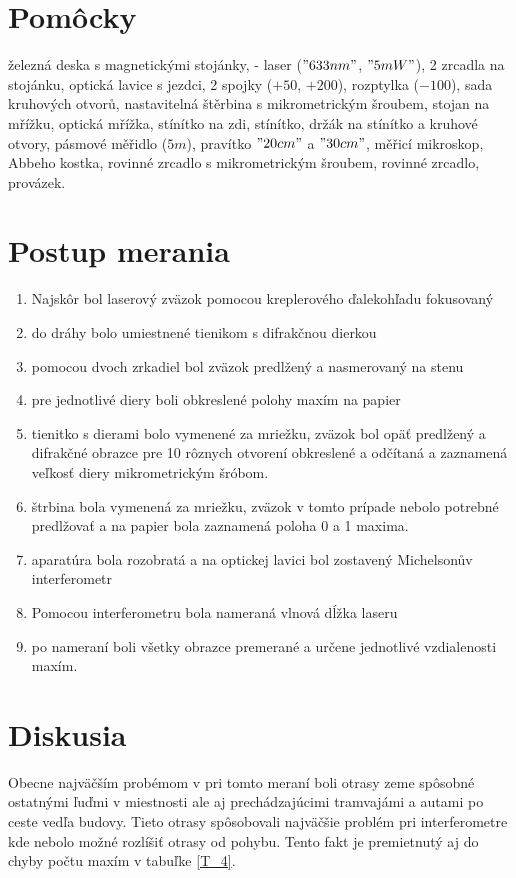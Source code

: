 \documentclass[10pt]{scrartcl}
\begin{document}
\MakeFJFIHead{}






\section{Pomôcky}
železná deska s magnetickými stojánky, - laser ($"633 nm"$, $"5 mW"$), 2 zrcadla na
stojánku, optická lavice s jezdci, 2 spojky ($+50$, $+200$), rozptylka ($−100$), sada kruhových otvorů,
nastavitelná štěrbina s mikrometrickým šroubem, stojan na mřížku, optická mřížka, stínítko na
zdi, stínítko, držák na stínítko a kruhové otvory, pásmové měřidlo ($5 m$), pravítko $"20 cm"$ a $"30 cm"$,
měřicí mikroskop, Abbeho kostka, rovinné zrcadlo s mikrometrickým šroubem, rovinné zrcadlo,
provázek.

\section{Postup merania}
\begin{enumerate}
\item Najskôr bol laserový zväzok pomocou kreplerového ďalekohľadu fokusovaný
\item do dráhy bolo umiestnené tienikom s difrakčnou dierkou
\item pomocou dvoch zrkadiel bol zväzok predlžený a nasmerovaný na stenu
\item pre jednotlivé diery boli obkreslené polohy maxím na papier
\item tienitko s dierami bolo vymenené za mriežku, zväzok bol opäť predlžený a difrakčné obrazce pre 10 rôznych otvorení obkreslené a odčítaná a zaznamená veľkosť diery mikrometrickým šróbom.
\item štrbina bola vymenená za mriežku, zväzok v tomto prípade nebolo potrebné predlžovať a na papier bola zaznamená poloha 0 a 1 maxima.
\item aparatúra bola rozobratá a na optickej lavici bol zostavený Michelsonův interferometr
\item Pomocou interferometru bola nameraná vlnová dĺžka laseru
\item po nameraní boli všetky obrazce premerané a určene jednotlivé vzdialenosti maxím.
\end{enumerate}



\section{Diskusia}
Obecne najväčším probémom v pri tomto meraní boli otrasy zeme spôsobné ostatnými ľuďmi v miestnosti ale aj prechádzajúcimi tramvajámi a autami po ceste vedľa budovy.
Tieto otrasy spôsobovali najväčšie problém pri interferometre kde nebolo možné rozlíšiť otrasy od pohybu. Tento fakt je premietnutý aj do chyby počtu maxím v tabuľke \ref{T_4}.
\end{document}
